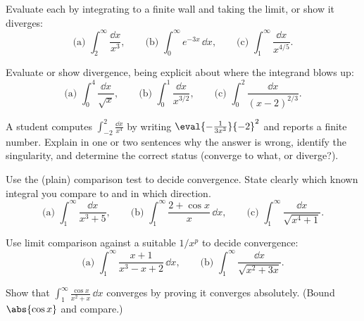 \begin{exercise}
\label{ch25:exr-eval-first}
Evaluate each by integrating to a finite wall and taking the limit, or show it
diverges:
\[
  \text{(a) } \int_2^{\infty}\frac{\dd x}{x^3},
  \qquad
  \text{(b) } \int_0^{\infty} e^{-3x}\,\dd x,
  \qquad
  \text{(c) } \int_1^{\infty}\frac{\dd x}{x^{4/5}}.
\]
\end{exercise}

\begin{exercise}
\label{ch25:exr-eval-second}
Evaluate or show divergence, being explicit about where the integrand blows up:
\[
  \text{(a) } \int_0^{4}\frac{\dd x}{\sqrt{x}},
  \qquad
  \text{(b) } \int_0^{1}\frac{\dd x}{x^{3/2}},
  \qquad
  \text{(c) } \int_0^{2}\frac{\dd x}{(x-2)^{2/3}}.
\]
\end{exercise}

\begin{exercise}
\label{ch25:exr-hidden}
A student computes $\int_{-2}^{2}\frac{\dd x}{x^4}$ by writing
$\eval{-\frac{1}{3x^3}}{-2}^{2}$ and reports a finite number. Explain in one or two
sentences why the answer is wrong, identify the singularity, and determine the
correct status (converge to what, or diverge?).
\end{exercise}

\begin{exercise}
\label{ch25:exr-comparison}
Use the (plain) comparison test to decide convergence. State clearly which known
integral you compare to and in which direction.
\[
  \text{(a) } \int_1^{\infty}\frac{\dd x}{x^3 + 5},
  \qquad
  \text{(b) } \int_1^{\infty}\frac{2 + \cos x}{x}\,\dd x,
  \qquad
  \text{(c) } \int_1^{\infty}\frac{\dd x}{\sqrt{x^4 + 1}}.
\]
\end{exercise}

\begin{exercise}
\label{ch25:exr-limit-comparison}
Use limit comparison against a suitable $1/x^p$ to decide convergence:
\[
  \text{(a) } \int_1^{\infty}\frac{x + 1}{x^3 - x + 2}\,\dd x,
  \qquad
  \text{(b) } \int_1^{\infty}\frac{\dd x}{\sqrt{x^2 + 3x}}.
\]
\end{exercise}

\begin{exercise}
\label{ch25:exr-absolute}
Show that $\displaystyle\int_1^{\infty}\frac{\cos x}{x^2 + x}\,\dd x$ converges by
proving it converges absolutely. (Bound $\abs{\cos x}$ and compare.)
\end{exercise}


